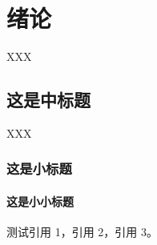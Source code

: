 
\chapter{绪论}
XXX
\section{这是中标题}
XXX
\subsection{这是小标题}
\subsubsection{这是小小标题}
测试引用 1\cite{周融2003}，引用 2\cite{伍蠡甫,图书馆,张筑生}，引用 3\cite{gbt7714_2006,冯西桥1998,姜锡洲,中国大学学报论文文摘,DUBAR2013--,FOURNEY}。

